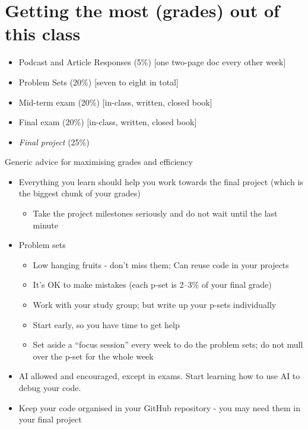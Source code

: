 \documentclass[
  11pt,
  letterpaper]{article}
\providecommand{\tightlist}{%
  \setlength{\itemsep}{0pt}\setlength{\parskip}{0pt}}
\begin{document}
\section{Getting the most (grades) out of this
class}\label{getting-the-most-grades-out-of-this-class}

\begin{itemize}
\tightlist
\item
  Podcast and Article Responses (5\%) {[}one two-page doc every other
  week{]}
\item
  Problem Sets (20\%) {[}seven to eight in total{]}
\item
  Mid-term exam (20\%) {[}in-class, written, closed book{]}
\item
  Final exam (20\%) {[}in-class, written, closed book{]}
\item
  \emph{Final project} (25\%)
\end{itemize}

\newpage

Generic advice for maximising grades and efficiency

\begin{itemize}
\tightlist
\item
  Everything you learn should help you work towards the final project
  (which is the biggest chunk of your grades)

  \begin{itemize}
  \tightlist
  \item
    Take the project milestones seriously and do not wait until the last
    minute
  \end{itemize}
\item
  Problem sets

  \begin{itemize}
  \tightlist
  \item
    Low hanging fruits - don't miss them; Can reuse code in your
    projects
  \item
    It's OK to make mistakes (each p-set is 2--3\% of your final grade)
  \item
    Work with your study group; but write up your p-sets individually
  \item
    Start early, so you have time to get help
  \item
    Set aside a ``focus session'' every week to do the problem sets; do
    not mull over the p-set for the whole week
  \end{itemize}
\item
  AI allowed and encouraged, except in exams. Start learning how to use
  AI to debug your code.
\item
  Keep your code organised in your GitHub repository - you may need them
  in your final project
\end{itemize}
\end{document}
